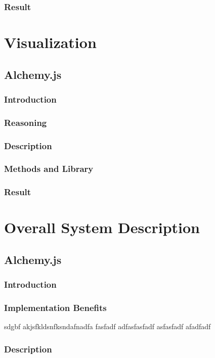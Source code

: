 \subsubsection{Result}

\section{Visualization}
\subsection{Alchemy.js}
\subsubsection{Introduction}
\subsubsection{Reasoning}
\subsubsection{Description}
\subsubsection{Methods and Library}
\subsubsection{Result}


\section{Overall System Description}
\subsection{Alchemy.js}
\subsubsection{Introduction}
\subsubsection{Implementation Benefits}
sdgbf akjsfkldsnfksndafnadfa
fasfadf
adfasfasfadf
asfasfadf
afadfadf
\subsubsection{Description}
